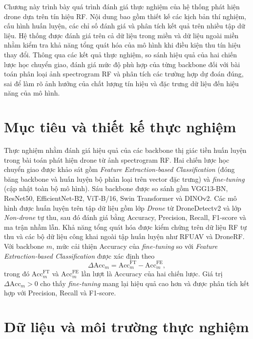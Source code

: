 \documentclass[../DoAn.tex]{subfiles}
\begin{document}
\label{chap:danh_gia_thuc_nghiem}

Chương này trình bày quá trình đánh giá thực nghiệm của hệ thống phát hiện drone dựa trên tín hiệu RF. Nội dung bao gồm thiết kế các kịch bản thí nghiệm, cấu hình huấn luyện, các chỉ số đánh giá và phân tích kết quả trên nhiều tập dữ liệu. Hệ thống được đánh giá trên cả dữ liệu trong miền và dữ liệu ngoài miền nhằm kiểm tra khả năng tổng quát hóa của mô hình khi điều kiện thu tín hiệu thay đổi. Thông qua các kết quả thực nghiệm, so sánh hiệu quả của hai chiến lược học chuyển giao, đánh giá mức độ phù hợp của từng backbone đối với bài toán phân loại ảnh spectrogram RF và phân tích các trường hợp dự đoán đúng, sai để làm rõ ảnh hưởng của chất lượng tín hiệu và đặc trưng dữ liệu đến hiệu năng của mô hình.


\section{Mục tiêu và thiết kế thực nghiệm}

Thực nghiệm nhằm đánh giá hiệu quả của các backbone thị giác tiền huấn luyện trong bài toán phát hiện drone từ ảnh spectrogram RF. Hai chiến lược học chuyển giao được khảo sát gồm \textit{Feature Extraction-based Classification} (đóng băng backbone và huấn luyện bộ phân loại trên vector đặc trưng) và \textit{fine-tuning} (cập nhật toàn bộ mô hình). Sáu backbone được so sánh gồm VGG13-BN, ResNet50, EfficientNet-B2, ViT-B/16, Swin Transformer và DINOv2. Các mô hình được huấn luyện trên tập dữ liệu gồm lớp \textit{Drone} từ DroneDetectv2 và lớp \textit{Non-drone} tự thu, sau đó đánh giá bằng Accuracy, Precision, Recall, F1-score và ma trận nhầm lẫn. Khả năng tổng quát hóa được kiểm chứng trên dữ liệu RF tự thu và các bộ dữ liệu công khai ngoài tập huấn luyện như RFUAV và DroneRF. Với backbone $m$, mức cải thiện Accuracy của \textit{fine-tuning} so với \textit{Feature Extraction-based Classification} được xác định theo
\begin{equation}
    \Delta \mathrm{Acc}_{m}
    =
    \mathrm{Acc}^{\mathrm{FT}}_{m}
    -
    \mathrm{Acc}^{\mathrm{FE}}_{m},
    \label{eq:accuracy_gain}
\end{equation}
trong đó $\mathrm{Acc}^{\mathrm{FT}}_{m}$ và $\mathrm{Acc}^{\mathrm{FE}}_{m}$ lần lượt là Accuracy của hai chiến lược. Giá trị $\Delta \mathrm{Acc}_{m}>0$ cho thấy \textit{fine-tuning} mang lại hiệu quả cao hơn và được phân tích kết hợp với Precision, Recall và F1-score.

\section{Dữ liệu và môi trường thực nghiệm}
\end{document}
